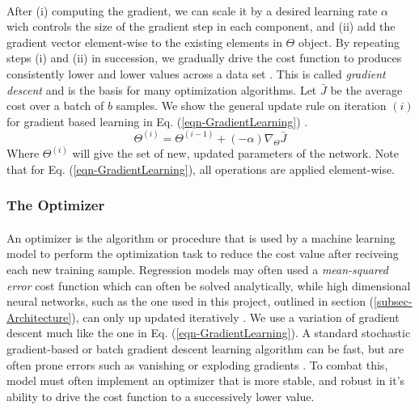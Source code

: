 \documentclass[12pt,letterpaper]{article}
\begin{document}
\paragraph*{}After (i) computing the gradient, we can scale it by a desired learning rate $\alpha$ wich controls the size of the gradient step in each component, and (ii) add the gradient vector element-wise to the existing elements in $\Theta$ object. By repeating steps (i) and (ii) in succession, we gradually drive the cost function to produces consistently lower and lower values across a data set \cite{Geron}. This is called \textit{gradient descent} and is the basis for many optimization algorithms. Let $\bar{J}$ be the average cost over a batch of $b$ samples. We show the general update rule on iteration $(i)$ for gradient based learning in Eq. (\ref{eqn-GradientLearning}) \cite{Geron,Goodfellow}.
\begin{equation}
\label{eqn-GradientLearning}
\Theta^{(i)} = \Theta^{(i-1)} + (-\alpha) \nabla_{\Theta} \bar{J}
\end{equation}
Where $\Theta^{(i)}$ will give the set of new, updated parameters of the network. Note that for Eq. (\ref{eqn-GradientLearning}), all operations are applied element-wise.


\subsubsection{The Optimizer}
\label{subsubsec-Optimizer}

\paragraph*{}An optimizer is the algorithm or procedure that is used by a machine learning model to perform the optimization task to reduce the cost value after reciveing each new training sample. Regression models may often used a \textit{mean-squared error} cost function which can often be solved analytically, while high dimensional neural networks, such as the one used in this project, outlined in section (\ref{subsec-Architecture}), can only up updated iteratively \cite{Goodfellow,James,Loy}. We use a variation of gradient descent much like the one in Eq. (\ref{eqn-GradientLearning}). A standard stochastic gradient-based or batch gradient descent learning algorithm can be fast, but are often prone errors such as vanishing or exploding gradients \cite{Geron,Goodfellow,Loy}. To combat this, model must often implement an optimizer that is more stable, and robust in it's ability to drive the cost function to a successively lower value.
\end{document}
